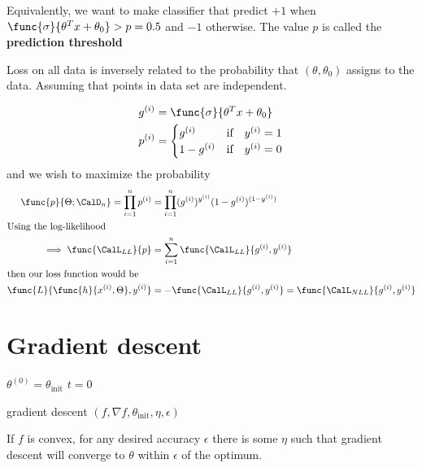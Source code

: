 Equivalently, we want to make classifier that predict \(+1\) when \(\func{\sigma}{\theta^T x+ \theta_0} > p = 0.5\) and \(-1\) otherwise. The value \(p\) is called the \textbf{prediction threshold}

Loss on all data is inversely related to the probability that \((\theta , \theta_0)\) assigns to the data. Assuming that points in data set are independent.

\begin{align*}
    g^{(i)} & =  \func{\sigma}{\theta^T x + \theta_0} \\
    p^{(i)} & = \begin{cases}
        g^{(i)}     & \text{if} \quad y^{(i)} = 1 \\
        1 - g^{(i)} & \text{if} \quad y^{(i)} = 0 \\
    \end{cases}
\end{align*}
and we wish to maximize the probability
\begin{align*}
    \func{p}{\Theta ; \CalD_n} = \prod_{i = 1}^n p^{(i)}       & = \prod_{i = 1}^n (g^{(i)})^{y^{(i)}} ( 1 - g^{(i)})^{(1 - y^{(i)})}                   \\
    \intertext{Using the log-likelihood}
    \implies \func{\CalL_{LL}}{p} & = \sum_{i = 1}^n \func{\CalL_{LL}}{g^{(i)} , y^{(i)}}\\
    \intertext{then our loss function would be}
    \func{L}{\func{h}{x^{(i)}, \Theta} , y^{(i)}} &= - \func{\CalL_{LL}}{g^{(i)} , y^{(i)}} =\func{\CalL_{NLL}}{g^{(i)} , y^{(i)}} 
\end{align*}
\section{Gradient descent}
\begin{algorithm}[H]
    \DontPrintSemicolon
    $\theta^{(0)} = \theta_{\mathrm{init}} $\;
    $t = 0 $\;


    \Return{$\theta $}
    \caption{ gradient descent $(f, \nabla f, \theta_{\mathrm{init}} , \eta , \epsilon )$}
\end{algorithm}

\begin{theorem}
    If \(f\) is convex, for any desired accuracy \(\epsilon\) there is some \(\eta\) such that gradient descent will converge to \(\theta\) within \(\epsilon\) of the optimum.
\end{theorem}